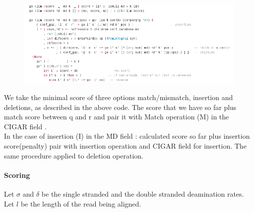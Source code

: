 \documentclass[11pt,a4paper]{report}
\begin{document}
\begin{figure}[H]
\centering
\includegraphics[width=15cm]{pictures/A_HS.png}
\label{formula}
\end{figure}


We take the minimal score of three options match/mismatch, insertion and 
deletions, as described in the above code.
The score that we have so far plus match score between q and r and pair it 
with Match operation (M) in the CIGAR field \cite{samtools}.\\
In the case of insertion (I) in the MD field \cite{samtools}: 
calculated score so far plus insertion score(penalty) pair with insertion
operation and CIGAR field for insertion.
The same procedure applied to deletion operation.

 
\paragraph{Scoring} \label{Scoring}

Let $\sigma$ and $\delta$ be the single stranded and the double stranded
deamination rates.  Let $l$ be the length of the read being aligned.  
\end{document}
